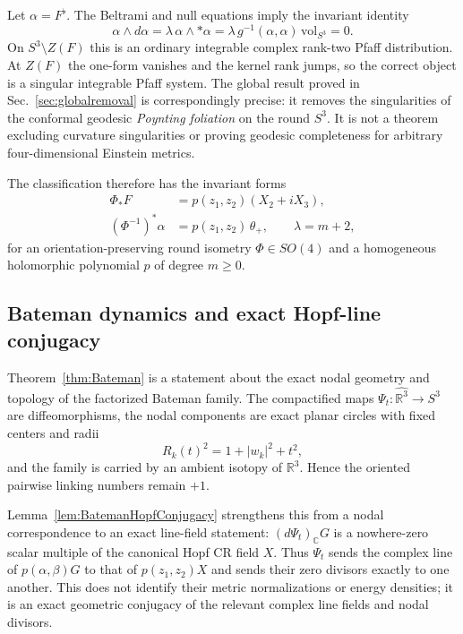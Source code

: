 \documentclass[aps,prd,reprint,nofootinbib,superscriptaddress]{revtex4-2}
\theoremstyle{definition}
\theoremstyle{remark}
\newcommand{\R}{\mathbb{R}}
\begin{document}
Let $\alpha=F^\flat$.  The Beltrami and null equations imply the invariant identity
\begin{equation}
\alpha\wedge d\alpha
=\lambda\,\alpha\wedge *\alpha
=\lambda\,g^{-1}(\alpha,\alpha)\,\mathrm{vol}_{S^3}
=0.
\label{eq:architecturePfaff}
\end{equation}
On $S^3\setminus Z(F)$ this is an ordinary integrable complex rank-two Pfaff distribution.  At $Z(F)$ the one-form vanishes and the kernel rank jumps, so the correct object is a singular integrable Pfaff system.  The global result proved in Sec.~\ref{sec:globalremoval} is correspondingly precise: it removes the singularities of the conformal geodesic \emph{Poynting foliation} on the round $S^3$.  It is not a theorem excluding curvature singularities or proving geodesic completeness for arbitrary four-dimensional Einstein metrics.

The classification therefore has the invariant forms
\begin{align}
\Phi_*F&=p(z_1,z_2)(X_2+iX_3),\nonumber\\
(\Phi^{-1})^*\alpha&=p(z_1,z_2)\,\theta_+,
\qquad \lambda=m+2,
\label{eq:architectureBeltrami}
\end{align}
for an orientation-preserving round isometry $\Phi\in SO(4)$ and a homogeneous holomorphic polynomial $p$ of degree $m\ge0$.

\subsection{Bateman dynamics and exact Hopf-line conjugacy}

Theorem~\ref{thm:Bateman} is a statement about the exact nodal geometry and topology of the factorized Bateman family.  The compactified maps $\Psi_t:\widehat{\R^3}\to S^3$ are diffeomorphisms, the nodal components are exact planar circles with fixed centers and radii
\begin{equation}
R_k(t)^2=1+|w_k|^2+t^2,
\end{equation}
and the family is carried by an ambient isotopy of $\R^3$.  Hence the oriented pairwise linking numbers remain $+1$.

Lemma~\ref{lem:BatemanHopfConjugacy} strengthens this from a nodal correspondence to an exact line-field statement: $(d\Psi_t)_{\mathbb C}G$ is a nowhere-zero scalar multiple of the canonical Hopf CR field $X$.  Thus $\Psi_t$ sends the complex line of $p(\alpha,\beta)G$ to that of $p(z_1,z_2)X$ and sends their zero divisors exactly to one another.  This does not identify their metric normalizations or energy densities; it is an exact geometric conjugacy of the relevant complex line fields and nodal divisors.
\end{document}
